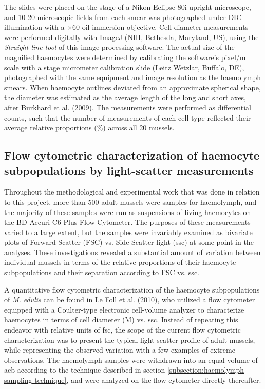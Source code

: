 The slides were placed on the stage of a Nikon Eclipse 80i upright microscope, and 10-20 microscopic fields from each smear was photographed under DIC illumination with a $\times$60 oil immersion objective. Cell diameter measurements were performed digitally with ImageJ (NIH, Bethesda, Maryland, US), using the \emph{Straight line tool} of this image processing software. The actual size of the magnified haemocytes were determined by calibrating the software's pixel/\micro m scale with a stage micrometer calibration slide (Leitz Wetzlar, Buffalo, DE), photographed with the same equipment and image resolution as the haemolymph smears. When haemocyte outlines deviated from an approximate spherical shape, the diameter was estimated as the average length of the long and short axes, after Burkhard et al. (2009). The measurements were performed as differential counts, such that the number of measurements of each cell type reflected their average relative proportions (\%) across all 20 mussels.

\subsection{Flow cytometric characterization of haemocyte subpopulations by light-scatter measurements}
Throughout the methodological and experimental work that was done in relation to this project, more than 500 adult mussels were samples for haemolymph, and the majority of these samples were run as suspensions of living haemocytes on the BD Accuri C6 Plus Flow Cytometer. The purposes of these measurements varied to a large extent, but the samples were invariably examined as bivariate plots of Forward Scatter (FSC) vs. Side Scatter light (\acrshort{ssc}) at some point in the analyses. These investigations revealed a substantial amount of variation between individual mussels in terms of the relative proportions of their haemocyte subpopulations and their separation according to FSC vs. \acrshort{ssc}.

A quantitative flow cytometric characterization of the haemocyte subpopulations of \emph{M. edulis} can be found in Le Foll et al. (2010), who utilized a flow cytometer equipped with a Coulter-type electronic cell-volume analyzer to characterize haemocytes in terms of cell diameter (\micro M) vs. \acrshort{ssc}. Instead of repeating this endeavor with relative units of \acrshort{fsc}, the scope of the current flow cytometric characterization was to present the typical light-scatter profile of adult mussels, while representing the observed variation with a few examples of extreme observations. The haemolymph samples were withdrawn into an equal volume of \acrshort{acb} according to the technique described in section \ref{subsection:haemolymph sampling technique}, and were analyzed on the flow cytometer directly thereafter.

